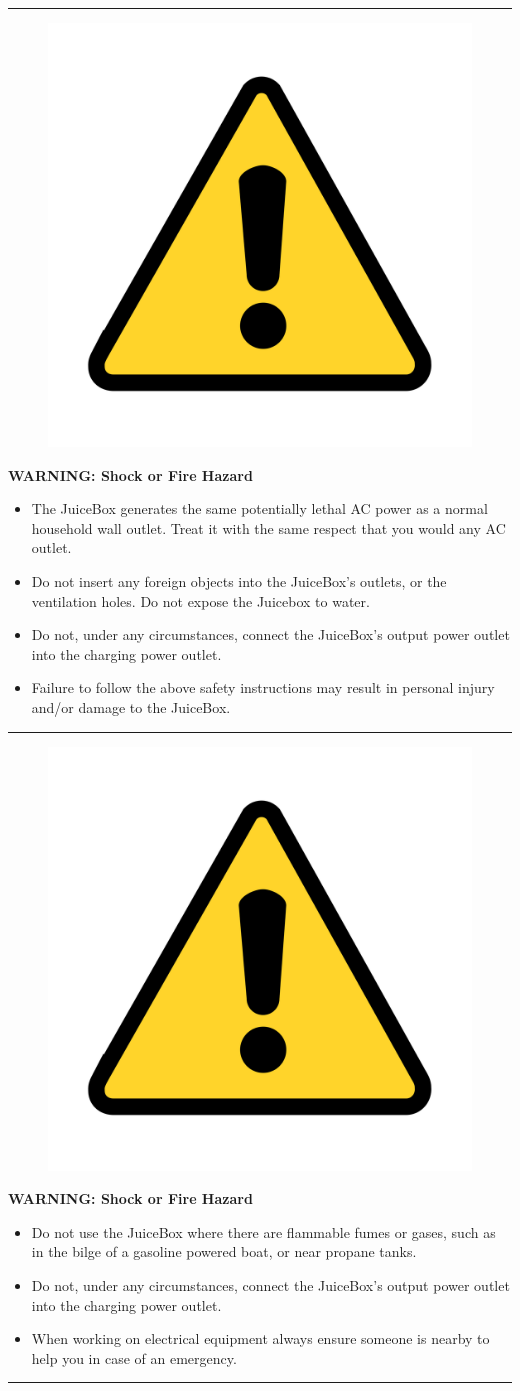 \documentclass[10pt]{article}
\begin{document}
\hrule 								%

\begin{figure} 					%
    \includegraphics[width=.75in]{warning_y} 	%
\end{figure}

\vspace{5mm}
\noindent   							%
\Large{\textbf{WARNING: Shock or Fire Hazard}} \\
\begin{large}                                        
	\begin{itemize}
		\item{The JuiceBox generates the same potentially lethal AC power as a normal
			household wall outlet. Treat it with the same respect that you would any AC	
			outlet.}
		\item{Do not insert any foreign objects into the JuiceBox's outlets, or the ventilation holes. 
			 Do not expose the Juicebox to water.}	
		\item{Do not, under any circumstances, connect the JuiceBox's output power outlet into the charging power outlet.}
		\item{Failure to follow the above safety instructions may result in personal injury
			and/or damage to the JuiceBox.}
	\end{itemize}
\end{large}
\hrule

\begin{figure}
    \includegraphics[width=.75in]{warning_y}
\end{figure}

\vspace{5mm}
\noindent   
\Large{\textbf{WARNING: Shock or Fire Hazard}} \\
\begin{large}                   
	\begin{itemize}
		\item{Do not use the JuiceBox where there are flammable fumes or gases, such as
			 in the bilge of a gasoline powered boat, or near propane tanks.}	
		\item{Do not, under any circumstances, connect the JuiceBox's output power outlet into the charging power outlet.}
		\item{When working on electrical equipment always ensure someone is nearby to
			 help you in case of an emergency.}
	\end{itemize}
\end{large}
\hrule
\end{document}
